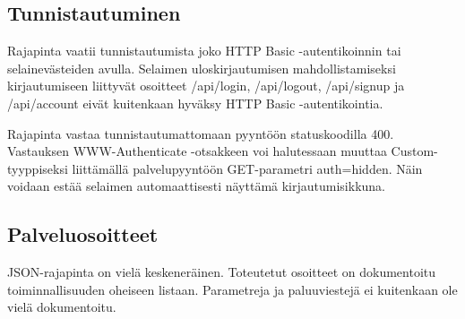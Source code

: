 \documentclass[a4paper]{scrartcl}
\begin{document}
\subsection{Tunnistautuminen}

Rajapinta vaatii tunnistautumista joko HTTP Basic -autentikoinnin tai
selainevästeiden avulla. Selaimen uloskirjautumisen mahdollistamiseksi
kirjautumiseen liittyvät osoitteet /api/login,
/api/logout, /api/signup ja /api/account eivät kuitenkaan hyväksy
HTTP Basic -autentikointia.

Rajapinta vastaa tunnistautumattomaan pyyntöön statuskoodilla 400.
Vastauksen WWW-Authenticate -otsakkeen voi halutessaan muuttaa
Custom-tyyppiseksi liittämällä palvelupyyntöön GET-parametri auth=hidden.
Näin voidaan estää selaimen automaattisesti näyttämä kirjautumisikkuna.

\subsection{Palveluosoitteet}

JSON-rajapinta on vielä keskeneräinen. Toteutetut osoitteet on dokumentoitu
toiminnallisuuden oheiseen listaan. Parametreja ja paluuviestejä ei kuitenkaan
ole vielä dokumentoitu.
\end{document}

